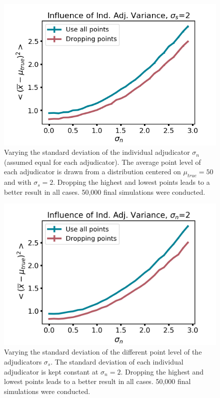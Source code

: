 \documentclass[%
 reprint,
 amsmath,amssymb,
 aps,
]{revtex4-1}
\begin{document}
\begin{figure}[hbt!]
	\includegraphics[width=\linewidth]{single_speaker_sigma_s_2_var_sigma_n}
	\caption{Varying the standard deviation of the individual adjudicator $\sigma_n$ (assumed equal for each adjudicator). The average point level of each adjudicator is drawn from a distribution centered on $\mu_{true}=50$ and with $\sigma_s=2$. Dropping the highest and lowest points leads to a better result in all cases. 50,000 final simulations were conducted.}
	\label{fig:single_speaker_vary_sigma_n}
\end{figure}

\begin{figure}[hbt!]
	\includegraphics[width=\linewidth]{single_speaker_var_sigma_s_sigma_n_2}
	\caption{Varying the standard deviation of the different point level of the adjudicators $\sigma_s$. The standard deviation of each individual adjudicator is kept constant at $\sigma_n = 2$. Dropping the highest and lowest points leads to a better result in all cases. 50,000 final simulations were conducted.}
	\label{fig:single_speaker_vary_sigma_s}
\end{figure}
\end{document}
